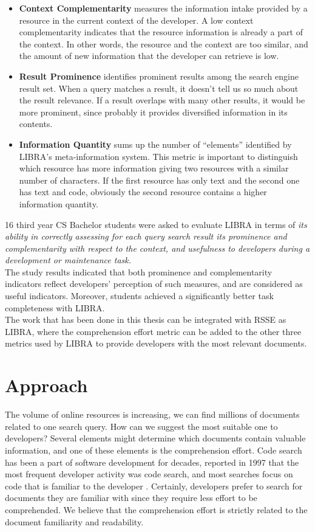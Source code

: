 \documentclass[12pt,mscthesis]{usiinfthesis}
\begin{document}
	\begin{itemize}
	\item \textbf{Context Complementarity} measures the information intake provided by a resource in the current context of the developer. A low context complementarity indicates that the resource information is already a part of the context. In other words, the resource and the context are too similar, and the amount of new information that the developer can retrieve is low.
	
	\item \textbf{Result Prominence} identifies prominent results among the search engine result set. When a query matches a result, it doesn't tell us so much about the result relevance. If a result overlaps with many other results, it would be more prominent, since probably it provides diversified information in its contents.
	
	\item \textbf{Information Quantity} sums up the number of ``elements'' identified by LIBRA's meta-information system. This metric is important to distinguish which resource has more information giving two resources with a similar number of characters. If the first resource has only text and the second one has text and code, obviously the second resource contains a higher information quantity.
	\end{itemize}
	16 third year CS Bachelor students were asked to evaluate LIBRA in terms of \textit{its ability in correctly assessing for each query search result its prominence and complementarity with respect to the context, and usefulness to developers during a development or maintenance task.}\\
	The study results indicated that both prominence and complementarity indicators reflect developers’ perception of such measures, and are considered as useful indicators. Moreover, students  achieved a significantly better task completeness with LIBRA.\\

	The work that has been done in this thesis can be integrated with RSSE as LIBRA, where the comprehension effort metric can be added to the other three metrics used by LIBRA to provide developers with the most relevant documents.


\chapter{Approach}
	The volume of online resources is increasing, we can find millions of documents related to one search query. How can we suggest the most suitable one to developers? Several elements might determine which documents contain valuable information, and one of these elements is the comprehension effort. Code search has been a part of software development for decades, \citet{Singer-1997} reported in 1997 that the most frequent developer activity was code search, and most searches focus on code that is familiar to the developer \cite{Sadowski:2015}. Certainly, developers prefer to search for documents they are familiar with since they require less effort to be comprehended. We believe that the comprehension effort is strictly related to the document familiarity and readability.
     
\end{document}
